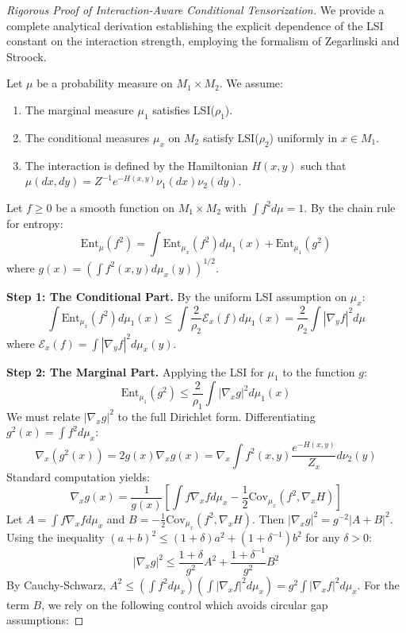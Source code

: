 \begin{proof}[Rigorous Proof of Interaction-Aware Conditional Tensorization]
We provide a complete analytical derivation establishing the explicit dependence of the LSI constant on the interaction strength, employing the formalism of Zegarlinski and Stroock.

Let $\mu$ be a probability measure on $M_1 \times M_2$. We assume:
\begin{enumerate}
    \item The marginal measure $\mu_1$ satisfies LSI($\rho_1$).
    \item The conditional measures $\mu_x$ on $M_2$ satisfy LSI($\rho_2$) uniformly in $x \in M_1$.
    \item The interaction is defined by the Hamiltonian $H(x,y)$ such that $\mu(dx,dy) = Z^{-1} e^{-H(x,y)} \nu_1(dx)\nu_2(dy)$.
\end{enumerate}

Let $f \ge 0$ be a smooth function on $M_1 \times M_2$ with $\int f^2 d\mu = 1$. By the chain rule for entropy:
\begin{equation}
\mathrm{Ent}_\mu(f^2) = \int \mathrm{Ent}_{\mu_x}(f^2) d\mu_1(x) + \mathrm{Ent}_{\mu_1}(g^2)
\end{equation}
where $g(x) = \left(\int f^2(x,y) d\mu_x(y)\right)^{1/2}$.

\textbf{Step 1: The Conditional Part.}
By the uniform LSI assumption on $\mu_x$:
\begin{equation}
\int \mathrm{Ent}_{\mu_x}(f^2) d\mu_1(x) \le \int \frac{2}{\rho_2} \mathcal{E}_x(f) d\mu_1(x) = \frac{2}{\rho_2} \int |\nabla_y f|^2 d\mu
\end{equation}
where $\mathcal{E}_x(f) = \int |\nabla_y f|^2 d\mu_x(y)$.

\textbf{Step 2: The Marginal Part.}
Applying the LSI for $\mu_1$ to the function $g$:
\begin{equation}
\mathrm{Ent}_{\mu_1}(g^2) \le \frac{2}{\rho_1} \int |\nabla_x g|^2 d\mu_1(x)
\end{equation}
We must relate $|\nabla_x g|^2$ to the full Dirichlet form. Differentiating $g^2(x) = \int f^2 d\mu_x$:
\begin{equation}
\nabla_x (g^2(x)) = 2g(x) \nabla_x g(x) = \nabla_x \int f^2(x,y) \frac{e^{-H(x,y)}}{Z_x} d\nu_2(y)
\end{equation}
Standard computation yields:
\begin{equation}
\nabla_x g(x) = \frac{1}{g(x)} \left[ \int f \nabla_x f d\mu_x - \frac{1}{2} \mathrm{Cov}_{\mu_x}(f^2, \nabla_x H) \right]
\end{equation}
Let $A = \int f \nabla_x f d\mu_x$ and $B = -\frac{1}{2} \mathrm{Cov}_{\mu_x}(f^2, \nabla_x H)$.
Then $|\nabla_x g|^2 = g^{-2} |A+B|^2$.
Using the inequality $(a+b)^2 \le (1+\delta)a^2 + (1+\delta^{-1})b^2$ for any $\delta > 0$:
\begin{equation}
|\nabla_x g|^2 \le \frac{1+\delta}{g^2} A^2 + \frac{1+\delta^{-1}}{g^2} B^2
\end{equation}
By Cauchy-Schwarz, $A^2 \le (\int f^2 d\mu_x) (\int |\nabla_x f|^2 d\mu_x) = g^2 \int |\nabla_x f|^2 d\mu_x$.
For the term $B$, we rely on the following control which avoids circular gap assumptions:


\end{proof}
